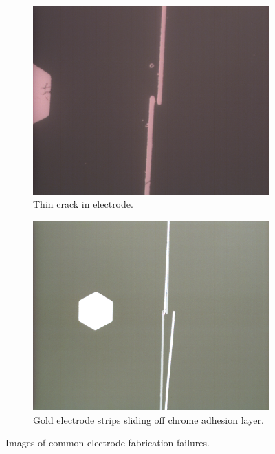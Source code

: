 \begin{figure}[h]
\begin{subfigure}[t]{0.45\textwidth}
    \end{subfigure}
    \\
    \vspace{0.1 in}
    \begin{subfigure}[t]{0.45\textwidth}
        \centering
        \includegraphics[width=\textwidth]{images/electrodeFailureThinBreak.png}
        \caption{Thin crack in electrode.}
    \end{subfigure}
    \hfill
    \begin{subfigure}[t]{0.45\textwidth}
        \centering
        \includegraphics[width=\textwidth]{images/electrodeFailureSlide.png}
        \caption{Gold electrode strips sliding off chrome adhesion layer.}
    \end{subfigure}
    \caption{Images of common electrode fabrication failures.}
    \label{fig:failed_elecftrodes_micro}
\end{figure}

